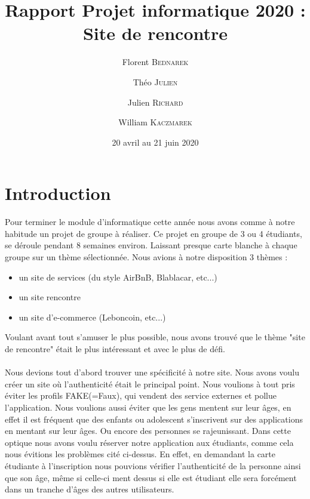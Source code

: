 \documentclass[12pt]{report}
\title{Rapport Projet informatique 2020 :\\Site de rencontre}
\author{Florent \textsc{Bednarek} \and Théo \textsc{Julien} \and Julien \textsc{Richard}\and William \textsc{Kaczmarek}}
\date{20  avril au 21 juin 2020}
\begin{document}
	\maketitle
	\tableofcontents
	\clearpage
\section{Introduction} 
	Pour terminer le module d'informatique cette année nous avons comme à notre habitude un projet de groupe à réaliser. Ce projet en groupe de 3 ou 4 étudiants, se déroule pendant 8 semaines environ. Laissant presque carte blanche à chaque groupe sur un thème sélectionnée. Nous avions à notre disposition 3 thèmes : \\
\begin{itemize}
	\item un site de services (du style AirBnB, Blablacar, etc...)
	\item un site rencontre
	\item un site d'e-commerce (Leboncoin, etc...)\\
\end{itemize}
Voulant avant tout s'amuser le plus possible, nous avons trouvé que le thème "site de rencontre" était le plus intéressant et avec le plus de défi.\\
\\
Nous devions tout d'abord trouver une spécificité à notre site. Nous avons voulu créer un site où l'authenticité était le principal point. Nous voulions à tout pris éviter les profils FAKE(=Faux), qui vendent des service externes et pollue l'application. Nous voulions aussi éviter que les gens mentent sur leur âges, en effet il est fréquent que des enfants ou adolescent s'inscrivent sur des applications en mentant sur leur âges. Ou encore des personnes se rajeunissant. Dans cette optique nous avons voulu réserver notre application aux étudiants, comme cela nous évitions les problèmes cité ci-dessus. En effet, en demandant la carte étudiante à l'inscription nous pouvions vérifier l'authenticité de la personne ainsi que son âge, même si celle-ci ment dessus si elle est étudiant elle sera forcément dans un tranche d'âges des autres utilisateurs. \\
\\ 
\end{document}
